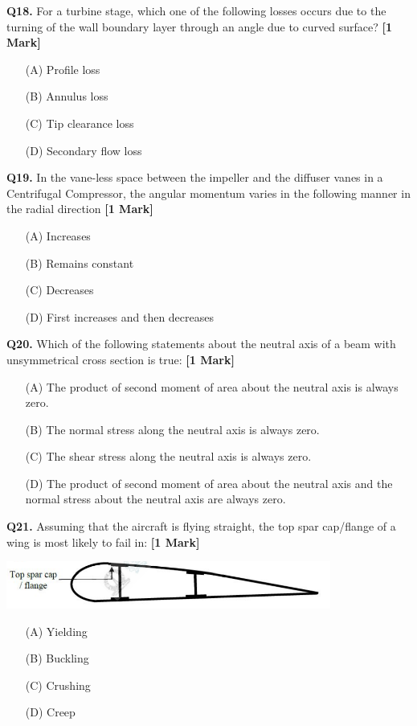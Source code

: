\documentclass[11pt]{article}
\newcommand{\questiona}[2]{
    \noindent\textbf{Q#2.} #1 \hfill \textbf{[1 Mark]}
}
\begin{document}
\vspace{0.5cm}

\questiona{For a turbine stage, which one of the following losses occurs due to the turning of the wall boundary layer through an angle due to curved surface?}{18}
\begin{enumerate}
    \item[(A)] Profile loss
    \item[(B)] Annulus loss
    \item[(C)] Tip clearance loss
    \item[(D)] Secondary flow loss
\end{enumerate}

\vspace{0.5cm}

\questiona{In the vane-less space between the impeller and the diffuser vanes in a Centrifugal Compressor, the angular momentum varies in the following manner in the radial direction}{19}
\begin{enumerate}
    \item[(A)] Increases
    \item[(B)] Remains constant
    \item[(C)] Decreases
    \item[(D)] First increases and then decreases
\end{enumerate}

\vspace{0.5cm}

\questiona{Which of the following statements about the neutral axis of a beam with unsymmetrical cross section is true:}{20}
\begin{enumerate}
    \item[(A)] The product of second moment of area about the neutral axis is always zero.
    \item[(B)] The normal stress along the neutral axis is always zero.
    \item[(C)] The shear stress along the neutral axis is always zero.
    \item[(D)] The product of second moment of area about the neutral axis and the normal stress about the neutral axis are always zero.
\end{enumerate}

\vspace{0.5cm}

\questiona{Assuming that the aircraft is flying straight, the top spar cap/flange of a wing is most likely to fail in:}{21}
\begin{center}
\includegraphics[width=0.8\textwidth]{figures/21.png}
\end{center}
\begin{enumerate}
    \item[(A)] Yielding
    \item[(B)] Buckling
    \item[(C)] Crushing
    \item[(D)] Creep
\end{enumerate}
\end{document}
